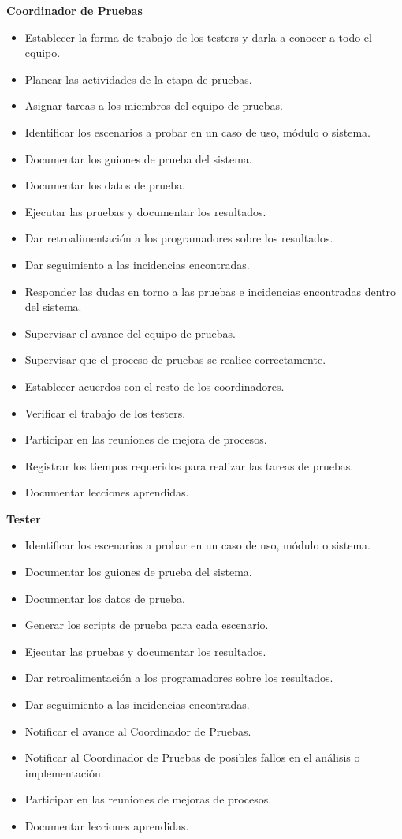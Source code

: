 \textbf{Coordinador de Pruebas}
\begin{itemize}
 \item Establecer la forma de trabajo de los testers y darla a conocer a todo el equipo.
 \item Planear las actividades de la etapa de pruebas.
 \item Asignar tareas a los miembros del equipo de pruebas.
 \item Identificar los escenarios a probar en un caso de uso, módulo o sistema.
 \item Documentar los guiones de prueba del sistema.
 \item Documentar los datos de prueba.
 \item Ejecutar las pruebas y documentar los resultados.
 \item Dar retroalimentación a los programadores sobre los resultados.
 \item Dar seguimiento a las incidencias encontradas.
 \item Responder las dudas en torno a las pruebas e incidencias encontradas dentro del sistema.
 \item Supervisar el avance del equipo de pruebas.
 \item Supervisar que el proceso de pruebas se realice correctamente.
 \item Establecer acuerdos con el resto de los coordinadores.
 \item Verificar el trabajo de los testers.
 \item Participar en las reuniones de mejora de procesos.
 \item Registrar los tiempos requeridos para realizar las tareas de pruebas.
 \item Documentar lecciones aprendidas.\\
\end{itemize}
\newpage 
\textbf{Tester}
\begin{itemize}
 \item Identificar los escenarios a probar en un caso de uso, módulo o sistema.
 \item Documentar los guiones de prueba del sistema.
 \item Documentar los datos de prueba.
 \item Generar los scripts de prueba para cada escenario.
 \item Ejecutar las pruebas y documentar los resultados.
 \item Dar retroalimentación a los programadores sobre los resultados.
 \item Dar seguimiento a las incidencias encontradas.
 \item Notificar el avance al Coordinador de Pruebas.
 \item Notificar al Coordinador de Pruebas de posibles fallos en el análisis o implementación.
 \item Participar en las reuniones de mejoras de procesos.
 \item Documentar lecciones aprendidas.\\
\end{itemize}


